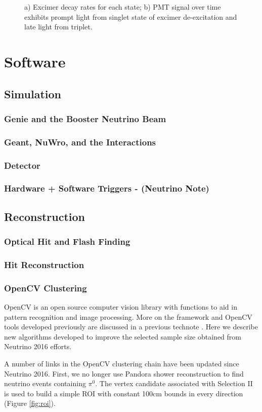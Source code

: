\documentclass[12pt]{article}
\begin{document}
\begin{figure}[h!]
\centering
{}
\hspace{2 mm}
\caption{ a) Excimer decay rates for each state; b) PMT signal over time exhibits prompt light from singlet state of excimer de-excitation and late light from triplet. } 
\label{fig:light}
\end{figure}


\clearpage

\newpage
\section{Software}
\subsection{Simulation}
\subsubsection{Genie and the Booster Neutrino Beam}
\subsubsection{Geant, NuWro, and the Interactions} 
\subsubsection{Detector}
\subsubsection{Hardware + Software Triggers - (Neutrino Note) }
\subsection{Reconstruction}
\subsubsection{Optical Hit and Flash Finding }
\subsubsection{Hit Reconstruction}
\subsubsection{OpenCV Clustering}
OpenCV is an open source computer vision library with functions to aid in pattern recognition and image processing. More on the framework and OpenCV tools developed previously are discussed in a previous technote \cite{bib:5856}. Here we describe new algorithms developed to improve the selected sample size obtained from Neutrino 2016 efforts\cite{bib:5864}.
\par A number of links in the OpenCV clustering chain have been updated since Neutrino 2016. First, we no longer use Pandora shower reconstruction to find neutrino events containing $\pi^0$. The vertex candidate associated with Selection II is used to build a simple ROI with constant 100cm bounds in every direction (Figure \ref{fig:roi}). 
\end{document}
